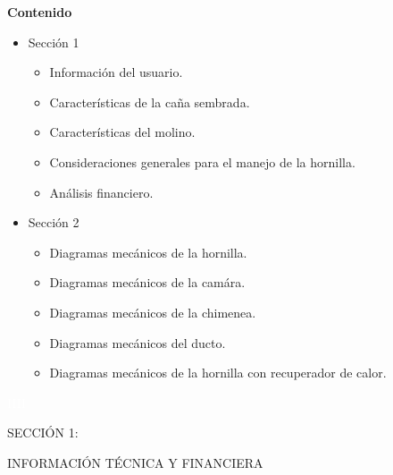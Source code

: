 \documentclass{article}%
\begin{document}
\newpage%
\begin{large}%
\begin{Large}%
\textbf{Contenido}%
\end{Large}%
\begin{itemize}%
\item%
Sección 1%
\begin{itemize}%
\item%
Información del usuario.%
\item%
Características de la caña sembrada.%
\item%
Características del molino.%
\item%
Consideraciones generales para el manejo de la hornilla.%
\item%
Análisis financiero.%
\end{itemize}%
\item%
Sección 2%
\begin{itemize}%
\item%
Diagramas mecánicos de la hornilla.%
\item%
Diagramas mecánicos de la camára.%
\item%
Diagramas mecánicos de la chimenea.%
\item%
Diagramas mecánicos del ducto.%
\item%
Diagramas mecánicos de la hornilla con recuperador de calor.%
\end{itemize}%
\end{itemize}%
\end{large}%
\newpage%
\begin{center}%
\textcolor{white}{%
HH%
}%
\linebreak%
\linebreak%
\linebreak%
\linebreak%
\linebreak%
\linebreak%
\linebreak%
\linebreak%
\linebreak%
\linebreak%
\linebreak%
\linebreak%
\linebreak%
\linebreak%
\linebreak%
\begin{Huge}%
SECCIÓN 1:%
\end{Huge}%
\linebreak%
\begin{Huge}%
INFORMACIÓN TÉCNICA Y FINANCIERA%
\end{Huge}%
\end{center}%
\end{document}
